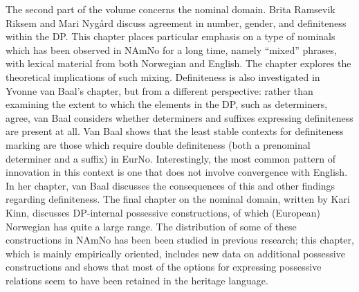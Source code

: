 \documentclass[output=paper,colorlinks,citecolor=brown]{langscibook}
\begin{document}
The second part of the volume concerns the nominal domain. Brita Ramsevik Riksem and Mari Nygård discuss agreement in number, gender, and definiteness within the DP. This chapter places particular emphasis on a type of nominals which has been observed in NAmNo for a long time, namely ``mixed'' phrases, with lexical material from both Norwegian and English. The chapter explores the theoretical implications of such mixing.  Definiteness is also investigated in Yvonne van Baal's chapter, but from a different perspective: rather than examining the extent to which the elements in the DP, such as determiners, agree, van Baal considers whether determiners and suffixes  expressing definiteness are present at all. Van Baal shows that the least stable contexts for definiteness marking are those which require double definiteness (both a prenominal determiner and a suffix) in EurNo. Interestingly, the most common pattern of innovation in this context is one that does not involve convergence with English. In her chapter, van Baal discusses the consequences of this and other findings regarding definiteness. The final chapter on the nominal domain, written by Kari Kinn, discusses DP-internal possessive constructions, of which (European) Norwegian has quite a large range. The distribution of some of these constructions in NAmNo has been been studied in previous research; this chapter, which is mainly empirically oriented, includes new data on additional possessive constructions and shows that most of the options for expressing possessive relations seem to have been retained in the heritage language. 
\end{document}
